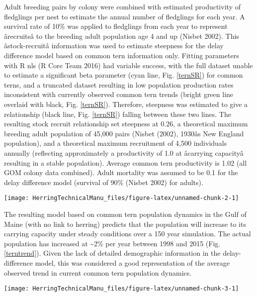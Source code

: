 \documentclass[]{article}
\let\origfigure\figure
\let\endorigfigure\endfigure
\renewenvironment{figure}[1][2] {
    \expandafter\origfigure\expandafter[H]
} {
    \endorigfigure
}
\begin{document}
Adult breeding pairs by colony were combined with estimated productivity
of fledglings per nest to estimate the annual number of fledglings for
each year. A survival rate of 10\% was applied to fledglings from each
year to represent ârecruitsâ to the breeding adult population age 4
and up (Nisbet 2002). This âstock-recruitâ information was used to
estimate steepness for the delay difference model based on common tern
information only. Fitting parameters with R nls (R Core Team 2016) had
variable success, with the full dataset unable to estimate a significant
beta parameter (cyan line, Fig. \ref{ternSR}) for common terns, and a
truncated dataset resulting in low population production rates
inconsistent with currently observed common tern trends (bright green
line overlaid with black, Fig. \ref{ternSR}). Therefore, steepness was
estimated to give a relationship (black line, Fig. \ref{ternSR}) falling
between these two lines. The resulting stock recruit relationship set
steepness at 0.26, a theoretical maximum breeding adult population of
45,000 pairs (Nisbet (2002), 1930âs New England population), and a
theoretical maximum recruitment of 4,500 individuals annually
(reflecting approximately a productivity of 1.0 at âcarrying
capacityâ resulting in a stable population). Average common tern
productivity is 1.02 (all GOM colony data combined). Adult mortality was
assumed to be 0.1 for the delay difference model (survival of 90\%
(Nisbet 2002) for adults).

\begin{figure}

{\centering \texttt{[image: HerringTechnicalManu\_files/figure-latex/unnamed-chunk-2-1]} 

}

\caption{Stock-recruitment function for Gulf of Maine common terns \label{ternSR}}\label{fig:unnamed-chunk-2}
\end{figure}

The resulting model based on common tern population dynamics in the Gulf
of Maine (with no link to herring) predicts that the population will
increase to its carrying capacity under steady conditions over a 150
year simulation. The actual population has increased at
\textasciitilde{}2\% per year between 1998 and 2015 (Fig.
\ref{terntrend}). Given the lack of detailed demographic information in
the delay-difference model, this was considered a good representation of
the average observed trend in current common tern population dynamics.

\begin{figure}

{\centering \texttt{[image: HerringTechnicalManu\_files/figure-latex/unnamed-chunk-3-1]} 

}

\caption{Population trends for Gulf of Maine terns, no herring link \label{terntrend}}\label{fig:unnamed-chunk-3}
\end{figure}
\end{document}
